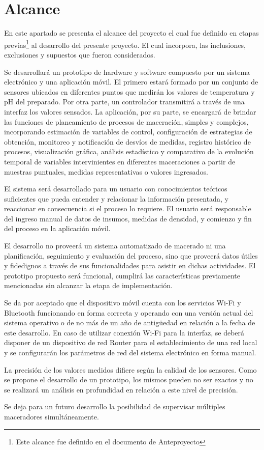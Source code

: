 \section{Alcance}
    \par
    En este apartado se presenta el alcance del proyecto el cual fue definido en etapas previas\footnote{Este alcance fue definido en el documento de Anteproyecto} al desarrollo del presente proyecto. El cual incorpora, las inclusiones, exclusiones y supuestos que fueron considerados.
    \par
    Se desarrollará un prototipo de hardware y software compuesto por un sistema electrónico y una aplicación móvil. El primero estará formado por un conjunto de sensores ubicados en diferentes puntos que medirán los valores de temperatura y pH del preparado. Por otra parte, un controlador transmitirá a través de una interfaz los valores sensados. La aplicación, por su parte, se encargará de brindar las funciones de planeamiento de procesos de maceración, simples y complejos, incorporando estimación de variables de control, configuración de estrategias de obtención, monitoreo y notificación de desvíos de medidas, registro histórico de procesos, visualización gráfica, análisis estadístico y comparativo de la evolución temporal de variables intervinientes en diferentes maceraciones a partir de muestras puntuales, medidas representativas o valores ingresados.
    \par
    El sistema será desarrollado para un usuario con conocimientos teóricos suficientes que pueda entender y relacionar la información presentada, y reaccionar en consecuencia si el proceso lo requiere. El usuario será responsable del ingreso manual de datos de insumos, medidas de densidad, y comienzo y fin del proceso en la aplicación móvil.
    \par
    El desarrollo no proveerá un sistema automatizado de macerado ni una planificación, seguimiento y evaluación del proceso, sino que proveerá datos útiles y fidedignos a través de sus funcionalidades para asistir en dichas actividades. El prototipo propuesto será funcional, cumplirá las características previamente mencionadas sin alcanzar la etapa de implementación.
    \par
    Se da por aceptado que el dispositivo móvil cuenta con los servicios Wi-Fi y Bluetooth funcionando en forma correcta y operando con una versión actual del sistema operativo o de no más de un año de antigüedad en relación a la fecha de este desarrollo. En caso de utilizar conexión Wi-Fi para la interfaz, se deberá disponer de un dispositivo de red Router para el establecimiento de una red local y se configurarán los parámetros de red del sistema electrónico en forma manual.
    \par
    La precisión de los valores medidos difiere según la calidad de los sensores. Como se propone el desarrollo de un prototipo, los mismos pueden no ser exactos y no se realizará un análisis en profundidad en relación a este nivel de precisión. 
    \par
    Se deja para un futuro desarrollo la posibilidad de supervisar múltiples maceradores simultáneamente. 
 
